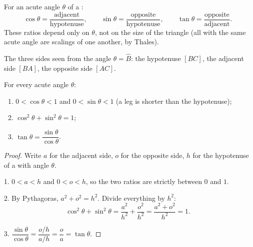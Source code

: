 \begin{definition}\label{def:g9:trig:ratios}
For an acute angle $\theta$ of a :
\[
\cos\theta = \frac{\text{adjacent}}{\text{hypotenuse}},
\qquad
\sin\theta = \frac{\text{opposite}}{\text{hypotenuse}},
\qquad
\tan\theta = \frac{\text{opposite}}{\text{adjacent}} .
\]
These ratios depend only on
$\theta$, not on the size of the triangle (all  with the
same acute angle are scalings of one another, by Thales).
\end{definition}

\begin{omfigure}

{\small The three sides seen from the angle $\theta = \widehat B$: the
hypotenuse $[BC]$, the adjacent side $[BA]$, the opposite side $[AC]$.}
\end{omfigure}

\begin{proposition}\label{prop:g9:trig:properties}
For every acute angle $\theta$:
\begin{enumerate}
  \item $0 < \cos\theta < 1$ and $0 < \sin\theta < 1$ (a leg is shorter
        than the hypotenuse);
  \item $\cos^2\theta + \sin^2\theta = 1$;
  \item $\tan\theta = \dfrac{\sin\theta}{\cos\theta}$.
\end{enumerate}
\end{proposition}

\begin{proof}
Write $a$ for the adjacent side, $o$ for the opposite side, $h$ for the
hypotenuse of a  with angle $\theta$.

1. $0 < a < h$ and $0 < o < h$, so the two ratios are strictly between
$0$ and $1$.

2. By Pythagoras, $a^2 + o^2 = h^2$. Divide everything by $h^2$:
\[
\cos^2\theta + \sin^2\theta
= \frac{a^2}{h^2} + \frac{o^2}{h^2}
= \frac{a^2 + o^2}{h^2} = 1 .
\]

3. $\dfrac{\sin\theta}{\cos\theta} = \dfrac{o/h}{a/h} = \dfrac oa
= \tan\theta$.
\end{proof}

